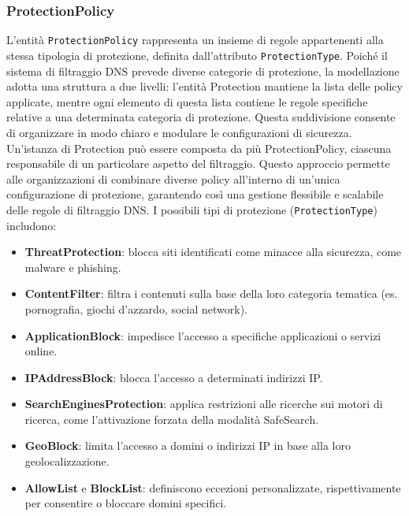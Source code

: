\subsubsection{ProtectionPolicy}
L'entità \texttt{ProtectionPolicy} rappresenta un insieme di regole appartenenti alla stessa tipologia di protezione, definita dall'attributo \texttt{ProtectionType}. Poiché il sistema di filtraggio DNS prevede diverse categorie di protezione, la modellazione adotta una struttura a due livelli: l'entità Protection mantiene la lista delle policy applicate, mentre ogni elemento di questa lista contiene le regole specifiche relative a una determinata categoria di protezione.
%
Questa suddivisione consente di organizzare in modo chiaro e modulare le configurazioni di sicurezza. Un'istanza di Protection può essere composta da più ProtectionPolicy, ciascuna responsabile di un particolare aspetto del filtraggio. Questo approccio permette alle organizzazioni di combinare diverse policy all'interno di un'unica configurazione di protezione, garantendo così una gestione flessibile e scalabile delle regole di filtraggio DNS.
%
I possibili tipi di protezione (\texttt{ProtectionType}) includono:
\begin{itemize}
  \item \textbf{ThreatProtection}: blocca siti identificati come minacce alla sicurezza, come malware e phishing.
  \item \textbf{ContentFilter}: filtra i contenuti sulla base della loro categoria tematica (es. pornografia, giochi d'azzardo, social network).
  \item \textbf{ApplicationBlock}: impedisce l’accesso a specifiche applicazioni o servizi online.
  \item \textbf{IPAddressBlock}: blocca l'accesso a determinati indirizzi IP.
  \item \textbf{SearchEnginesProtection}: applica restrizioni alle ricerche sui motori di ricerca, come l'attivazione forzata della modalità SafeSearch.
  \item \textbf{GeoBlock}: limita l’accesso a domini o indirizzi IP in base alla loro geolocalizzazione.
  \item \textbf{AllowList} e \textbf{BlockList}: definiscono eccezioni personalizzate, rispettivamente per consentire o bloccare domini specifici.
\end{itemize}

